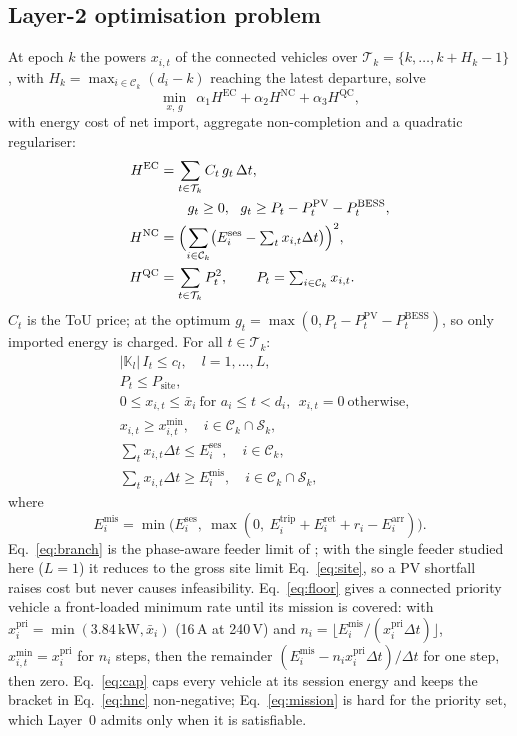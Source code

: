 \documentclass[preprint,12pt]{elsarticle}
\newcommand{\Ses}{E^{\mathrm{ses}}}
\newcommand{\Mis}{E^{\mathrm{mis}}}
\newcommand{\Psite}{P_{\mathrm{site}}}
\newcommand{\Cset}{\mathcal{C}_k}
\newcommand{\Sset}{\mathcal{S}_k}
\newcommand{\xpri}{x^{\mathrm{pri}}}
\begin{document}
\subsection{Layer-2 optimisation problem}
\label{sec:qp}
At epoch $k$ the powers $x_{i,t}$ of the connected vehicles over $\mathcal{T}_k=\{k,\dots,k+H_k-1\}$, with
$H_k=\max_{i\in\Cset}(d_i-k)$ reaching the latest departure, solve
\begin{equation}
  \min_{x,\,g}\ \ \alpha_1 H^{\mathrm{EC}}+\alpha_2 H^{\mathrm{NC}}+\alpha_3 H^{\mathrm{QC}},
  \label{eq:obj}
\end{equation}
with energy cost of net import, aggregate non-completion and a quadratic regulariser:
\begin{align}
  H^{\mathrm{EC}}&=\sum_{t\in\mathcal{T}_k} C_t\,g_t\,\Delta t, \notag\\
  &\qquad g_t\ge 0,\ \ g_t\ge P_t-P^{\mathrm{PV}}_t-P^{\mathrm{BESS}}_t, \label{eq:hec}\\
  H^{\mathrm{NC}}&=\Bigl(\sum_{i\in\Cset}\bigl(\Ses_i-\textstyle\sum_{t}x_{i,t}\Delta t\bigr)\Bigr)^{2}, \label{eq:hnc}\\
  H^{\mathrm{QC}}&=\sum_{t\in\mathcal{T}_k}P_t^{2},\qquad P_t=\textstyle\sum_{i\in\Cset}x_{i,t}. \label{eq:hqc}
\end{align}
$C_t$ is the ToU price; at the optimum $g_t=\max(0,P_t-P^{\mathrm{PV}}_t-P^{\mathrm{BESS}}_t)$, so only
imported energy is charged. For all $t\in\mathcal{T}_k$:
\begin{align}
  &|\mathbb{K}_l|\,I_t\le c_l,\quad l=1,\dots,L, \label{eq:branch}\\
  &P_t\le\Psite, \label{eq:site}\\
  &0\le x_{i,t}\le\bar{x}_i\ \text{for } a_i\le t<d_i,\ \ x_{i,t}=0\ \text{otherwise}, \label{eq:rate}\\
  &x_{i,t}\ge x^{\min}_{i,t},\quad i\in\Cset\cap\Sset, \label{eq:floor}\\
  &\textstyle\sum_{t}x_{i,t}\Delta t\le\Ses_i,\quad i\in\Cset, \label{eq:cap}\\
  &\textstyle\sum_{t}x_{i,t}\Delta t\ge\Mis_i,\quad i\in\Cset\cap\Sset, \label{eq:mission}
\end{align}
where
\begin{equation}
  \Mis_i=\min\!\bigl(\Ses_i,\ \max(0,\ E^{\mathrm{trip}}_i+E^{\mathrm{ret}}_i+r_i-E^{\mathrm{arr}}_i)\bigr).
  \label{eq:emission}
\end{equation}
Eq.~\eqref{eq:branch} is the phase-aware feeder limit of \cite{lee2021adaptive}; with the single feeder
studied here ($L=1$) it reduces to the gross site limit Eq.~\eqref{eq:site}, so a PV shortfall raises cost but
never causes infeasibility. Eq.~\eqref{eq:floor} gives a connected priority vehicle a front-loaded minimum
rate until its mission is covered: with $\xpri_i=\min(3.84\,\mathrm{kW},\bar{x}_i)$ (16\,A at 240\,V) and
$n_i=\lfloor\Mis_i/(\xpri_i\Delta t)\rfloor$, $x^{\min}_{i,t}=\xpri_i$ for $n_i$ steps, then the remainder
$(\Mis_i-n_i\xpri_i\Delta t)/\Delta t$ for one step, then zero. Eq.~\eqref{eq:cap} caps every vehicle at its
session energy and keeps the bracket in Eq.~\eqref{eq:hnc} non-negative; Eq.~\eqref{eq:mission} is hard for
the priority set, which Layer~0 admits only when it is satisfiable.
\end{document}

